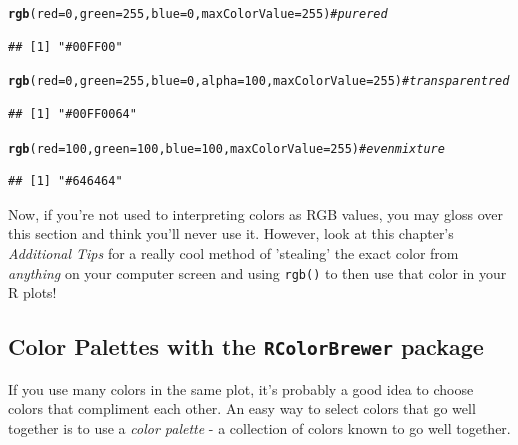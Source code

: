 \documentclass{tufte-book}\usepackage[]{graphicx}\usepackage[]{color}
\makeatletter
\newcommand{\hlnum}[1]{\textcolor[rgb]{0.686,0.059,0.569}{#1}}%
\newcommand{\hlcom}[1]{\textcolor[rgb]{0.678,0.584,0.686}{\textit{#1}}}%
\newcommand{\hlstd}[1]{\textcolor[rgb]{0.345,0.345,0.345}{#1}}%
\newcommand{\hlkwc}[1]{\textcolor[rgb]{0.333,0.667,0.333}{#1}}%
\newcommand{\hlkwd}[1]{\textcolor[rgb]{0.737,0.353,0.396}{\textbf{#1}}}%
\newenvironment{kframe}{%
 \def\at@end@of@kframe{}%
 \ifinner\ifhmode%
  \def\at@end@of@kframe{\end{minipage}}%
  \begin{minipage}{\columnwidth}%
 \fi\fi%
 \def\FrameCommand##1{\hskip\@totalleftmargin \hskip-\fboxsep
 \colorbox{shadecolor}{##1}\hskip-\fboxsep
     \hskip-\linewidth \hskip-\@totalleftmargin \hskip\columnwidth}%
 \MakeFramed {\advance\hsize-\width
   \@totalleftmargin\z@ \linewidth\hsize
   \@setminipage}}%
 {\par\unskip\endMakeFramed%
 \at@end@of@kframe}
\newenvironment{knitrout}{}{} %
\makeatother
\begin{document}
\begin{footnotesize}
\begin{footnotesize}
\begin{knitrout}
\color{fgcolor}\begin{kframe}
\begin{alltt}
\hlkwd{rgb}\hlstd{(}\hlkwc{red} \hlstd{=} \hlnum{0}\hlstd{,} \hlkwc{green} \hlstd{=} \hlnum{255}\hlstd{,} \hlkwc{blue} \hlstd{=} \hlnum{0}\hlstd{,} \hlkwc{maxColorValue} \hlstd{=} \hlnum{255}\hlstd{)} \hlcom{# pure red}
\end{alltt}
\begin{verbatim}
## [1] "#00FF00"
\end{verbatim}
\begin{alltt}
\hlkwd{rgb}\hlstd{(}\hlkwc{red} \hlstd{=} \hlnum{0}\hlstd{,} \hlkwc{green} \hlstd{=} \hlnum{255}\hlstd{,} \hlkwc{blue} \hlstd{=} \hlnum{0}\hlstd{,} \hlkwc{alpha} \hlstd{=} \hlnum{100}\hlstd{,} \hlkwc{maxColorValue} \hlstd{=} \hlnum{255}\hlstd{)} \hlcom{# transparent red}
\end{alltt}
\begin{verbatim}
## [1] "#00FF0064"
\end{verbatim}
\begin{alltt}
\hlkwd{rgb}\hlstd{(}\hlkwc{red} \hlstd{=} \hlnum{100}\hlstd{,} \hlkwc{green} \hlstd{=} \hlnum{100}\hlstd{,} \hlkwc{blue} \hlstd{=} \hlnum{100}\hlstd{,} \hlkwc{maxColorValue} \hlstd{=} \hlnum{255}\hlstd{)} \hlcom{# even mixture}
\end{alltt}
\begin{verbatim}
## [1] "#646464"
\end{verbatim}
\end{kframe}
\end{knitrout}
\end{footnotesize}

Now, if you're not used to interpreting colors as RGB values, you may gloss over this section and think you'll never use it. However, look at this chapter's \textit{Additional Tips} for a really cool method of 'stealing' the exact color from \textit{anything} on your computer screen and using \texttt{rgb()} to then use that color in your R plots!

\subsection{Color Palettes with the \texttt{RColorBrewer} package}

If you use many colors in the same plot, it's probably a good idea to choose colors that compliment each other. An easy way to select colors that go well together is to use a \textit{color palette} - a collection of colors known to go well together.


\end{footnotesize}
\end{document}
